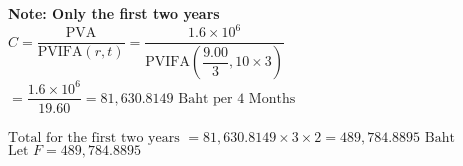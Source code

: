 \documentclass{article}
\begin{document}
\begin{outline}[enumerate]
	\2 \textbf{Note: Only the first two years }\\
		$ C = \dfrac{\mbox{PVA}}{\mbox{PVIFA}(r, t)} = \dfrac{1.6 \times 10^6}{\mbox{PVIFA}\left(\dfrac{9.00}{3}, 10 \times 3 \right)} $
		$ 	= \dfrac{1.6 \times 10^6}{19.60} =  81,630.8149 \mbox{ Baht per 4 Months}$\\\\
		$\mbox{Total for the first two years } = 81,630.8149 \times 3 \times 2 = 489,784.8895 \mbox{ Baht} $
		$\mbox{Let } F = 489,784.8895$
		
		
		
\end{outline}
\end{document}
